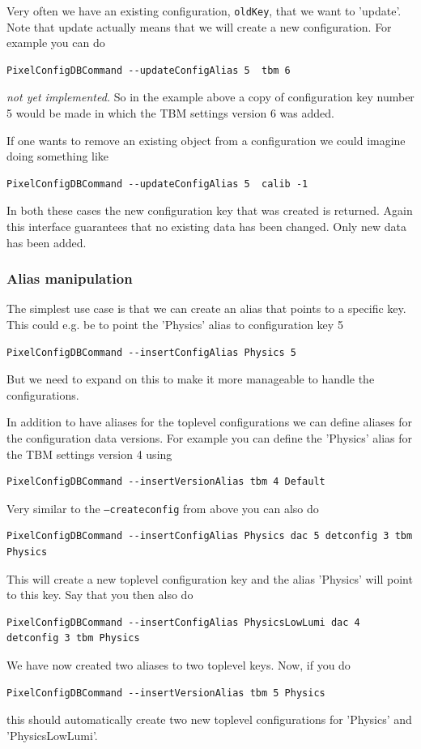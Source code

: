 Very often we have an existing configuration, {\tt oldKey}, that
we want to 'update'. Note that update actually means that we will create
a new configuration. For example you can do
\begin{verbatim}
PixelConfigDBCommand --updateConfigAlias 5  tbm 6
\end{verbatim}
{\it not yet implemented.} So in the example above a copy of 
configuration key number 5 would
be made in which the TBM settings version 6 was added.

If one wants to remove an existing object from a configuration
we could imagine doing something like
\begin{verbatim}
PixelConfigDBCommand --updateConfigAlias 5  calib -1
\end{verbatim}
 
In both these cases the new configuration key that was created is
returned. Again this interface guarantees that no existing 
data has been changed. Only new data has been added.


\subsubsection{Alias manipulation}


The simplest use case is that we can create an alias that points
to a specific key. This could e.g. be to point the 'Physics' 
alias to configuration key 5
\begin{verbatim}
PixelConfigDBCommand --insertConfigAlias Physics 5
\end{verbatim}

But we need to expand on this to make it more manageable
to handle the configurations.

In addition to have aliases for the toplevel configurations
we can define aliases for the configuration data versions.
For example you can define the 'Physics' alias for the TBM settings
version 4 using
\begin{verbatim}
PixelConfigDBCommand --insertVersionAlias tbm 4 Default
\end{verbatim}
Very similar to the {\tt --createconfig} from above you
can also do
\begin{verbatim}
PixelConfigDBCommand --insertConfigAlias Physics dac 5 detconfig 3 tbm Physics
\end{verbatim}
This will create a new toplevel configuration key and the 
alias 'Physics' will point to this key. Say that you then also do
\begin{verbatim}
PixelConfigDBCommand --insertConfigAlias PhysicsLowLumi dac 4 detconfig 3 tbm Physics
\end{verbatim}
We have now  created two aliases to two toplevel keys. Now, if you 
do
\begin{verbatim}
PixelConfigDBCommand --insertVersionAlias tbm 5 Physics
\end{verbatim}
this should automatically create two new toplevel configurations
for 'Physics' and 'PhysicsLowLumi'.


